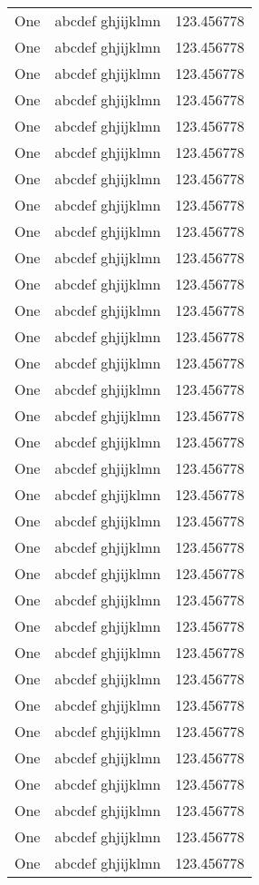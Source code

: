 \begin{ThreePartTable}
\begin{xltabular}{\linewidth}{@{}YYY@{}}
One & abcdef ghjijklmn & 123.456778 \\
One & abcdef ghjijklmn & 123.456778 \\
One & abcdef ghjijklmn & 123.456778 \\
One & abcdef ghjijklmn & 123.456778 \\
One & abcdef ghjijklmn & 123.456778 \\
One & abcdef ghjijklmn & 123.456778 \\
One & abcdef ghjijklmn & 123.456778 \\
One & abcdef ghjijklmn & 123.456778 \\
One & abcdef ghjijklmn & 123.456778 \\
One & abcdef ghjijklmn & 123.456778 \\
One & abcdef ghjijklmn & 123.456778 \\
One & abcdef ghjijklmn & 123.456778 \\
One & abcdef ghjijklmn & 123.456778 \\
One & abcdef ghjijklmn & 123.456778 \\
One & abcdef ghjijklmn & 123.456778 \\
One & abcdef ghjijklmn & 123.456778 \\
One & abcdef ghjijklmn & 123.456778 \\
One & abcdef ghjijklmn & 123.456778 \\
One & abcdef ghjijklmn & 123.456778 \\
One & abcdef ghjijklmn & 123.456778 \\
One & abcdef ghjijklmn & 123.456778 \\
One & abcdef ghjijklmn & 123.456778 \\
One & abcdef ghjijklmn & 123.456778 \\
One & abcdef ghjijklmn & 123.456778 \\
One & abcdef ghjijklmn & 123.456778 \\
One & abcdef ghjijklmn & 123.456778 \\
One & abcdef ghjijklmn & 123.456778 \\
One & abcdef ghjijklmn & 123.456778 \\
One & abcdef ghjijklmn & 123.456778 \\
One & abcdef ghjijklmn & 123.456778 \\
One & abcdef ghjijklmn & 123.456778 \\
One & abcdef ghjijklmn & 123.456778 \\
One & abcdef ghjijklmn & 123.456778 \\

\end{xltabular}
\end{ThreePartTable}
